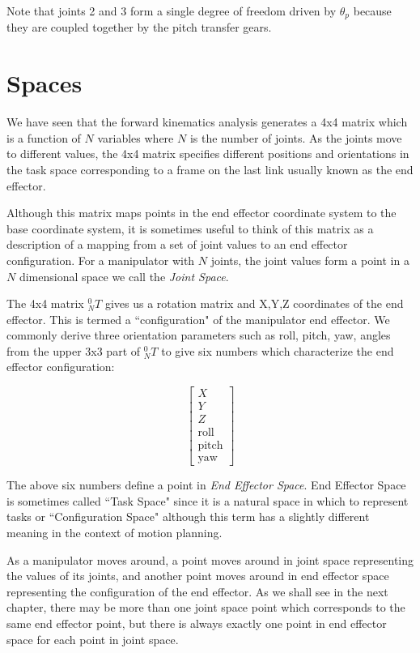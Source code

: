 \begin{ExampleCont}
Note that joints 2 and 3 form a single degree of freedom driven by $\theta_p$ because they are coupled together by the pitch transfer gears.

\end{ExampleCont}


\section{Spaces}

We have seen that the forward kinematics analysis generates a 4x4 matrix which is a function of $N$ variables where $N$ is the number of joints.   As the joints move to different values, the 4x4 matrix specifies different positions and orientations in the task space corresponding to a frame on the last link usually known as the end effector.

Although this matrix maps points in the end effector coordinate system to the base coordinate system, it is sometimes useful to think of this matrix as a description of a mapping from a set of joint values to an end effector configuration.   For a manipulator with $N$ joints, the joint values form a point in a $N$ dimensional space we call the {\it Joint Space}.

The 4x4 matrix $^0_NT$ gives us a rotation matrix and X,Y,Z coordinates of the end effector.  This is termed a ``configuration" of the manipulator end effector.   We commonly derive three orientation parameters such as roll, pitch, yaw, angles from the upper 3x3 part of $^0_NT$ to give six numbers which characterize the end effector configuration:

\begin{equation}
\left [
   \begin{array}{c}
	    X \\ Y \\ Z \\ \mathrm{roll} \\ \mathrm{pitch} \\ \mathrm{yaw}
   \end{array}
\right ]
\end{equation}

The above six numbers define a point in {\it End Effector Space}. End Effector Space is sometimes called ``Task Space" since it is a natural space in which to represent tasks or ``Configuration Space" although this term has a slightly different meaning in the context of motion planning.

As a manipulator moves around, a point moves around in joint space representing the values of its joints, and another point moves around in end effector space representing the configuration of the end effector.  As we shall see in the next chapter, there may be more than one joint space point which corresponds to the same end effector point, but there is always exactly one point in end effector space for each point in joint space.

